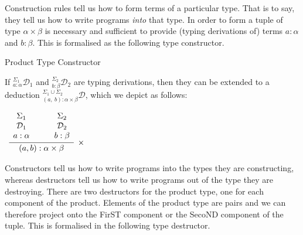 \documentclass{book}
\begin{document}
        Construction rules tell us how to form terms of a particular type. That is to say, they tell us how to write programs \emph{into} that type. In order to form a tuple of type $\alpha \times \beta$ is necessary and sufficient to provide (typing derivations of) terms $a : \alpha$ and $b : \beta$. This is formalised as the following type constructor.

        \begin{definition}{Product Type Constructor}

            If $^{\Sigma_{1}}_{a : \alpha}\mathcal{D}_{1}$ and $^{\Sigma_{2}}_{b : \beta}\mathcal{D}_{2}$ are typing derivations, then they can be extended to a deduction $^{\Sigma_{1}\cup \Sigma_{2}}_{(a, \ b) : \alpha \times \beta}\mathcal{D}$, which we depict as follows: 

            \begin{center}
                $\begin{array}{c}		
                    \infer[\times]{(a, b) : \alpha \times \beta}{\begin{array}{c} \Sigma_{1} \\ \mathcal{D}_{1} \\ a : \alpha \end{array} \quad & \begin{array}{c} \Sigma_{2} \\ \mathcal{D}_{2} \\  b : \beta \end{array}}	
                \end{array}$
            \end{center}
        \end{definition}

        Constructors tell us how to write programs into the types they are constructing, whereas destructors tell us how to write programs out of the type they are destroying. There are two destructors for the product type, one for each component of the product. Elements of the product type are pairs and we can therefore project onto the FirST component or the SecoND component of the tuple. This is formalised in the following type destructor. 
\end{document}
